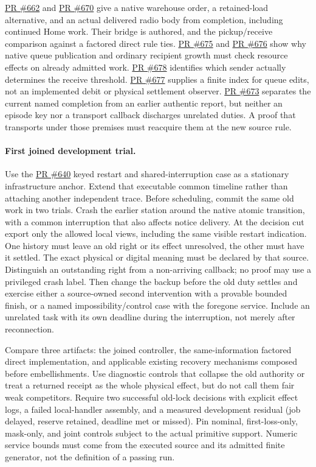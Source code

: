 \documentclass[11pt]{article}
\newcommand{\pr}[1]{\href{https://github.com/eternal-november/eos-research-programmes/pull/#1}{PR \##1}}
\begin{document}
\pr{662} and \pr{670} give a native warehouse order, a retained-load
alternative, and an actual delivered radio body from completion,
including continued Home work. Their bridge is authored, and the
pickup/receive comparison against a factored direct rule ties.
\pr{675} and \pr{676} show why native queue publication and ordinary
recipient growth must check resource effects on already admitted work.
\pr{678} identifies which sender actually determines the receive
threshold. \pr{677} supplies a finite index for queue edits, not an
implemented debit or physical settlement observer. \pr{673} separates
the current named completion from an earlier authentic report, but
neither an episode key nor a transport callback discharges unrelated
duties. A proof that transports under those premises must reacquire them
at the new source rule.

\paragraph{First joined development trial.}
Use the \pr{640} keyed restart and shared-interruption case as a
stationary infrastructure anchor. Extend that executable common timeline
rather than attaching another independent trace. Before scheduling,
commit the same old work in two trials. Crash the earlier station
around the native atomic transition, with a common interruption that
also affects notice delivery. At the decision cut export only the
allowed local views, including the same visible restart indication.
One history must leave an old right or its effect unresolved, the other
must have it settled. The exact physical or digital meaning must be
declared by that source. Distinguish an outstanding right from a
non-arriving callback; no proof may use a privileged crash label.
Then change the backup before the old duty settles and exercise either
a source-owned second intervention with a provable bounded finish,
or a named impossibility/control case with the foregone service.
Include an unrelated task with its own deadline during the interruption,
not merely after reconnection.

Compare three artifacts: the joined controller, the same-information
factored direct implementation, and applicable existing recovery
mechanisms composed before embellishments. Use diagnostic controls
that collapse the old authority or treat a returned receipt as the
whole physical effect, but do not call them fair weak competitors.
Require two successful old-lock decisions with explicit effect logs,
a failed local-handler assembly, and a measured development residual
(job delayed, reserve retained, deadline met or missed). Pin nominal,
first-loss-only, mask-only, and joint controls subject to the actual
primitive support. Numeric service bounds must come from the executed
source and its admitted finite generator, not the definition of a
passing run.
\end{document}
